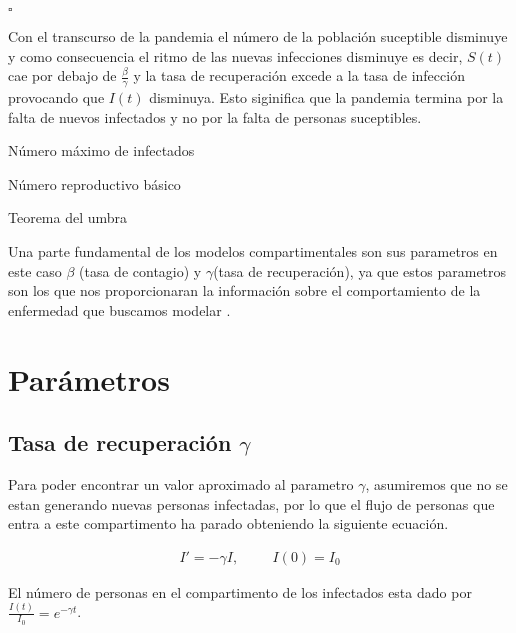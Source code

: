 \hfill	$\square$

Con el transcurso de la pandemia el número de la población suceptible disminuye y como consecuencia el ritmo de las nuevas infecciones disminuye es decir, $S(t)$ cae por debajo de $\frac{\beta}{\gamma}$ y la tasa de recuperación excede a la tasa de infección provocando que $I(t)$ disminuya. Esto siginifica que la pandemia termina por la falta de nuevos infectados y no por la falta de personas suceptibles.

\begin{Af}
Número máximo de infectados
\end{Af}

\begin{Af}
Número reproductivo básico
\end{Af}

\begin{Af}
Teorema del umbra
\end{Af}


Una parte fundamental de los modelos compartimentales son sus parametros en este caso $\beta$ (tasa de contagio) y $\gamma$(tasa de recuperación), ya que estos parametros son los que nos proporcionaran la información sobre el comportamiento de la enfermedad que buscamos modelar \cite{Martcheva}.

\section{Parámetros}
\subsection{Tasa de recuperación \textbf{$\gamma$}}

Para poder encontrar un valor aproximado al parametro $\gamma$, asumiremos que no se estan generando nuevas personas infectadas, por lo que el flujo de personas que entra a este compartimento ha parado obteniendo la siguiente ecuación.

\begin{align}
I' = -\gamma I, \hspace{1cm} I(0) = I_{0}
\end{align}

\begin{Af}

El número de personas en el compartimento de los infectados esta dado por $\frac{I(t)}{I_{0}} = e^{-\gamma t}$.

\end{Af}


